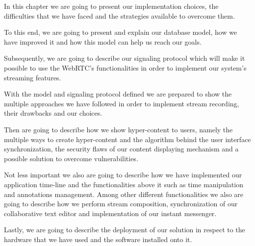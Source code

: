 
In this chapter we are going to present our implementation choices, the difficulties that we have faced and the strategies available to overcome them.

To this end, we are going to present and explain our database model, how we have improved it and how this model can help us reach our goals. 

Subsequently, we are going to describe our signaling protocol which will make it possible to use the \ac{WebRTC}'s functionalities in order to implement our system's streaming features.

With the model and signaling protocol defined we are prepared to show the multiple approaches we have followed in order to implement stream recording, their drawbacks and our choices.

Then are going to describe how we show hyper-content to users, namely the multiple ways to create hyper-content and the algorithm behind the user interface synchronization, the security flaws of our content displaying mechanism and a possible solution to overcome vulnerabilities. 

Not less important we also are going to describe how we have implemented our application time-line and the functionalities above it such as time manipulation and annotations management. Among other different functionalities we also are going to describe how we perform stream composition, synchronization of our collaborative text editor and implementation of our instant messenger.

Lastly, we are going to describe the deployment of our solution in respect to the hardware that we have used and the software installed onto it.






